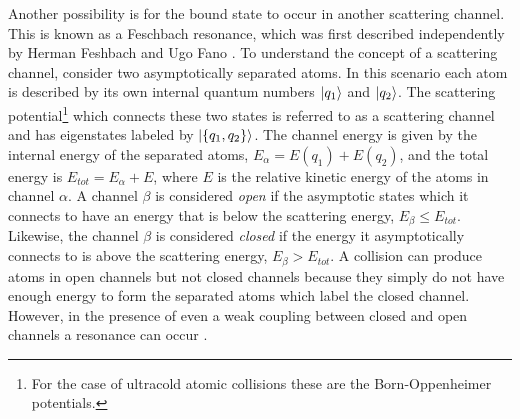 \documentclass[prl,onecolumn,amsmath,amssymb,titlepage,nofootinbib,preprint]{revtex4-1}
\begin{document}
	Another possibility is for the bound state to occur in another scattering channel.  This is known as a Feschbach resonance, which was first described independently by Herman Feshbach \cite{Feshbach1958}\cite{Feshbach1962} and Ugo Fano \cite{Fano1961}. To understand the concept of a scattering channel, consider two asymptotically separated atoms.  In this scenario each atom is described by its own internal quantum numbers $\ket{q_{1}}$ and $\ket{q_{2}}$.  The scattering potential\footnote{For the case of ultracold atomic collisions these are the Born-Oppenheimer potentials.} which connects these two states is referred to as a scattering channel and has eigenstates labeled by $\ket{\{q_{1},q_{2}\}}$.  The channel energy is given by the internal energy of the separated atoms, $E_{\alpha}=E(q_{1})+E(q_{2})$, and the total energy is $E_{tot}=E_{\alpha}+E$, where $E$ is the relative kinetic energy of the atoms in channel $\alpha$.  A channel $\beta$ is considered \textit{open} if the asymptotic states which it connects to have an energy that is below the scattering energy, $E_{\beta}\le E_{tot}$.  Likewise, the channel $\beta$ is considered \textit{closed} if the energy it asymptotically connects to is above the scattering energy, $E_{\beta}>E_{tot}$.  A collision can produce atoms in open channels but not closed channels because they simply do not have enough energy to form the separated atoms which label the closed channel.  However, in the presence of even a weak coupling between closed and open channels a resonance can occur \cite{Chin2010}.
	
\end{document}
